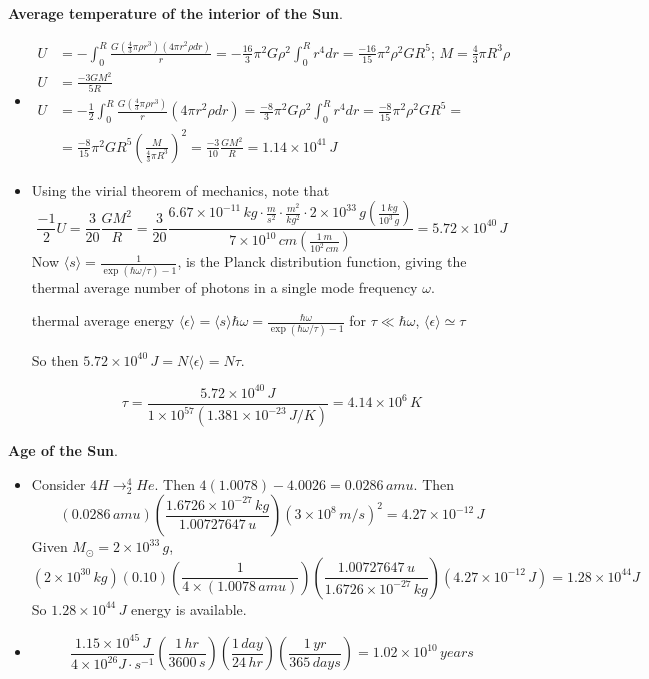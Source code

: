  \textbf{Average temperature of the interior of the Sun}.  
\begin{itemize}
\item[(a)] 
\[
\begin{aligned}
  U & = - \int_0^R \frac{ G \left( \frac{4}{3} \pi \rho r^3 \right) ( 4\pi r^2 \rho dr ) }{ r} = - \frac{16}{3} \pi^2 G \rho^2 \int_0^R r^4 dr = \frac{-16}{15} \pi^2 \rho^2 GR^5; \, M = \frac{4}{3} \pi R^3 \rho \\ 
  U & = \frac{- 3 GM^2 }{5 R } \\
  U & = -\frac{1}{2} \int_0^R \frac{ G \left( \frac{4}{3} \pi \rho r^3  \right) }{ r } (4 \pi r^2 \rho dr ) = \frac{ - 8 }{3} \pi^2 G \rho^2 \int_0^R r^4 dr = \frac{- 8 }{15} \pi^2 \rho^2 GR^5 = \\ 
  & = \frac{-8}{15} \pi^2 GR^5 \left( \frac{ M }{ \frac{4}{3} \pi R^3 } \right)^2 = \frac{-3}{10} \frac{GM^2 }{R} = 1.14 \times 10^{41} \, J
\end{aligned}
\]
\item[(b)] Using the virial theorem of mechanics, note that 
\[
\frac{-1}{2} U = \frac{3}{20} \frac{ GM^2}{R} = \frac{3}{20} \frac{ 6.67 \times 10^{-11} \, kg \cdot \frac{m}{s^2} \cdot \frac{m^2}{ kg^2} \cdot 2 \times 10^{33} \, g \left( \frac{ 1 \, kg }{ 10^3 \, g } \right) }{ 7 \times 10^{10} \, cm \left( \frac{1 \, m}{ 10^2 \, cm } \right) } = 5.72 \times 10^{40} \, J
\]
Now $\langle s \rangle = \frac{1}{ \exp{ ( \hbar \omega /\tau )} - 1 }$, is the Planck distribution function, giving the thermal average number of photons in a single mode frequency $\omega$.  

thermal average energy $\langle \epsilon \rangle = \langle s \rangle \hbar \omega = \frac{ \hbar \omega}{ \exp{ ( \hbar \omega/\tau )} - 1 }$ for $\tau \ll \hbar \omega$, $\langle \epsilon \rangle \simeq \tau$

So then $5.72 \times 10^{40} \, J = N \langle \epsilon \rangle = N \tau$.

\[
\tau = \frac{ 5.72 \times 10^{40} \, J }{ 1 \times 10^{57 } ( 1.381 \times 10^{-23} \, J/K ) } = \boxed{ 4.14 \times 10^6 \, K }
\]
\end{itemize}  



 \textbf{Age of the Sun}.  
\begin{itemize}
\item[(a)] Consider  $4H \to ^4_2He$.  Then $4 (1.0078) - 4.0026 = 0.0286 \, amu$.  Then 
\[
(0.0286 \, amu)\left( \frac{ 1.6726 \times 10^{-27} \, kg}{1.00727647 \, u} \right)(3\times 10^8 \, m/s)^2 = 4.27 \times 10^{-12} \, J
\] 
Given $M_{\odot} = 2 \times 10^33 \, g$, 
\[
(2 \times 10^{30} \, kg)(0.10)\left( \frac{1}{ 4 \times (1.0078 \, amu) } \right) \left( \frac{ 1.00727647 \, u}{ 1.6726 \times 10^{-27} \, kg } \right) (4.27 \times 10^{-12} \, J ) = 1.28 \times 10^{44} J
\]
So $\boxed{ 1.28 \times 10^{44} \, J}$ energy is available.  
\item[(b)]
\[
\frac{1.15 \times 10^{45} \, J}{ 4 \times 10^{26} J \cdot s^{-1} } \left( \frac{ 1 \, hr }{3600 \, s} \right) \left( \frac{ 1\, day }{ 24 \, hr } \right) \left( \frac{ 1 \, yr }{365 \, days} \right) = 1.02  \times 10^{10} \, years 
\]
\end{itemize}


